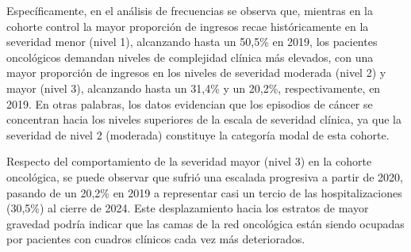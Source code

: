 Específicamente, en el análisis de frecuencias se observa que, mientras en la cohorte control la mayor proporción de ingresos recae históricamente en la severidad menor (nivel 1), alcanzando hasta un 50,5\% en 2019, los pacientes oncológicos demandan niveles de complejidad clínica más elevados, con una mayor proporción de ingresos en los niveles de severidad moderada (nivel 2) y mayor (nivel 3), alcanzando hasta un 31,4\% y un 20,2\%, respectivamente, en 2019. En otras palabras, los datos evidencian que los episodios de cáncer se concentran hacia los niveles superiores de la escala de severidad clínica, ya que la severidad de nivel 2 (moderada) constituye la categoría modal de esta cohorte.

Respecto del comportamiento de la severidad mayor (nivel 3) en la cohorte oncológica, se puede observar que sufrió una escalada progresiva a partir de 2020, pasando de un 20,2\% en 2019 a representar casi un tercio de las hospitalizaciones (30,5\%) al cierre de 2024. Este desplazamiento hacia los estratos de mayor gravedad podría indicar que las camas de la red oncológica están siendo ocupadas por pacientes con cuadros clínicos cada vez más deteriorados.

